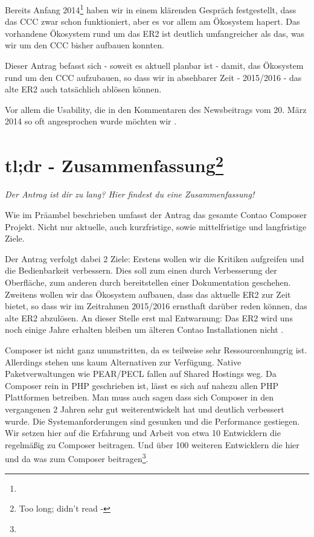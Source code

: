 \documentclass[
paper=a4,
draft=false,%
fontsize=10pt%
]{scrartcl}
\begin{document}
Bereits Anfang 2014\footnote{} haben wir in einem klärenden Gespräch festgestellt, dass das CCC zwar schon funktioniert, aber es vor allem am Ökosystem hapert. Das vorhandene Ökosystem rund um das ER2 ist deutlich umfangreicher als das, was wir um den CCC bisher aufbauen konnten.

Dieser Antrag befasst sich - soweit es aktuell planbar ist - damit, das Ökosystem rund um den CCC aufzubauen, so dass wir in absehbarer Zeit - 2015/2016 - das alte ER2 auch tatsächlich ablösen können.

Vor allem die  Usability, die in den Kommentaren des Newsbeitrags vom 20. März 2014 so oft angesprochen wurde möchten wir .

\pagebreak
\tableofcontents
\pagebreak

%
%

\section[tl;dr - Zusammenfassung]{tl;dr - Zusammenfassung\footnote{Too long; didn't read -
}}
\label{sec:summary}

\textit{Der Antrag ist dir zu lang? Hier findest du eine Zusammenfassung!}

Wie im Präambel beschrieben umfasst der Antrag das gesamte Contao Composer Projekt. Nicht nur aktuelle, auch kurzfristige, sowie mittelfristige und langfristige Ziele.

Der Antrag verfolgt dabei 2 Ziele:
Erstens wollen wir die Kritiken aufgreifen und die Bedienbarkeit verbessern. Dies soll zum einen durch Verbesserung der Oberfläche, zum anderen durch bereitstellen einer Dokumentation geschehen.
Zweitens wollen wir das Ökosystem aufbauen, dass das aktuelle ER2 zur Zeit bietet, so dass wir im Zeitrahmen 2015/2016 ernsthaft darüber reden können, das alte ER2 abzulösen. An dieser Stelle erst mal Entwarnung: Das ER2 wird uns noch einige Jahre erhalten bleiben um älteren Contao Installationen nicht .

Composer ist nicht ganz unumstritten, da es teilweise sehr Ressourcenhungrig ist. Allerdings stehen uns kaum Alternativen zur Verfügung. Native Paketverwaltungen wie PEAR/PECL fallen auf Shared Hostings weg. Da Composer rein in PHP geschrieben ist, lässt es sich auf nahezu allen PHP Plattformen betreiben. Man muss auch sagen dass sich Composer in den vergangenen 2 Jahren sehr gut weiterentwickelt hat und deutlich verbessert wurde. Die Systemanforderungen sind gesunken und die Performance gestiegen. Wir setzen hier auf die Erfahrung und Arbeit von etwa 10 Entwicklern die regelmäßig zu Composer beitragen. Und über 100 weiteren Entwicklern die hier und da was zum Composer beitragen\footnote{}.
\end{document}
